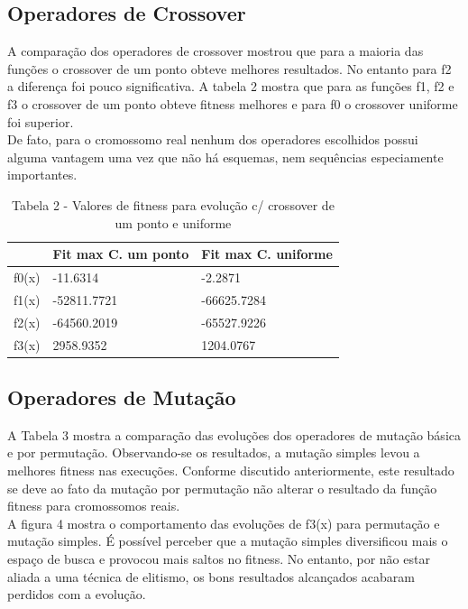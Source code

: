 \documentclass[conference]{IEEEtran}
\begin{document}
\subsection{Operadores de Crossover}
A comparação dos operadores de crossover mostrou que para a maioria das funções 
o crossover de um ponto obteve melhores resultados. No entanto para f2 a diferença foi pouco
significativa. A tabela 2 mostra que para as funções f1, f2 e f3  o crossover de um ponto obteve fitness
melhores e para f0 o crossover uniforme foi superior. \\
De fato, para o cromossomo real nenhum dos operadores escolhidos possui alguma 
vantagem uma vez que não há esquemas, nem sequências especiamente importantes.\\

\begin{table}[!htbp]
\begin{tabular}{|l|l|l|}
\hline
      & Fit max C. um ponto & Fit max C. uniforme \\ \hline
f0(x) & -11.6314            & -2.2871             \\ \hline
f1(x) & -52811.7721         & -66625.7284         \\ \hline
f2(x) & -64560.2019         & -65527.9226         \\ \hline
f3(x) & 2958.9352           & 1204.0767           \\ \hline
\end{tabular}
\caption*{Tabela 2 - Valores de fitness para evolução c/ crossover de um ponto e uniforme}
\end{table}

\subsection{Operadores de Mutação}
A Tabela 3 mostra a comparação das evoluções dos operadores de mutação básica e
por permutação. Observando-se os resultados, a mutação simples levou 
a melhores fitness nas execuções. Conforme discutido anteriormente, este 
resultado se deve ao fato da mutação por permutação não alterar o resultado da 
função fitness para cromossomos reais.\\
A figura 4 mostra o comportamento das evoluções de f3(x) para permutação e mutação
simples. É possível perceber que a mutação simples diversificou mais o espaço de busca
e provocou mais saltos no fitness. No entanto, por não estar aliada a uma técnica de elitismo,
os bons resultados alcançados acabaram perdidos com a evolução.
\end{document}
